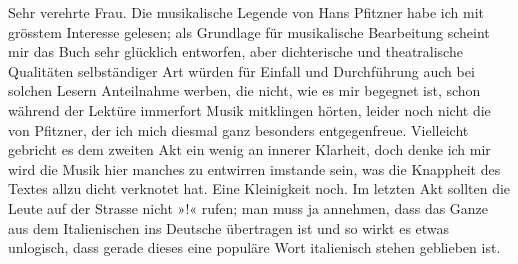 \pstart\center{}Sehr verehrte Frau.\pend\vspace{0.5em}
\pstart
           Die musikalische Legende von
                  Hans Pfitzner habe ich mit grösstem
               Interesse gelesen; als Grundlage für musikalische Bearbeitung scheint mir das Buch sehr glücklich entworfen,
               aber  dichterische und theatralische Qualitäten
               selbständiger Art würden für Einfall und Durchführung auch bei solchen Lesern
               Anteilnahme werben, die nicht, wie es mir begegnet ist, schon während der Lektüre
               immerfort Musik mitklingen hörten, leider noch nicht die von Pfitzner, der ich mich diesmal ganz besonders entgegenfreue.
               Vielleicht gebricht es dem zweiten
                  Akt ein wenig an innerer Klarheit, doch denke ich mir wird die Musik hier
               manches zu entwirren imstande sein, was die Knappheit des Textes allzu dicht
               verknotet hat. Eine Kleinigkeit noch. Im letzten Akt sollten die Leute auf der Strasse nicht »\label{K_L02574-1v}\label{K_L02574-1}!« rufen; man muss ja
               annehmen, dass das Ganze aus dem Italienischen
               ins Deutsche über{\pb}tragen ist und so wirkt es etwas unlogisch,
               dass gerade dieses eine populäre Wort italienisch stehen geblieben ist.\pend
           
